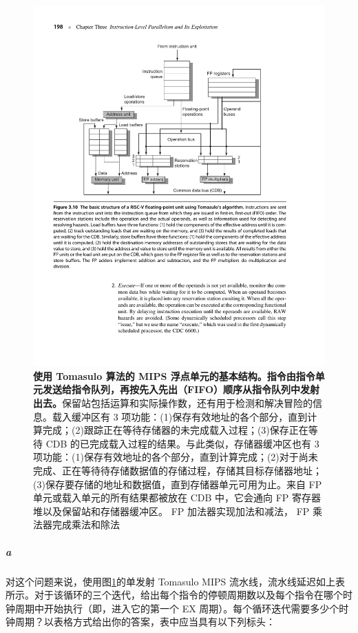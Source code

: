 \documentclass{article}
\begin{document}
\begin{figure}[h]
    \centering
    \includegraphics[scale = 1]{3-10.pdf}
    \caption{\textbf{使用 Tomasulo 算法的 MIPS 浮点单元的基本结构。指令由指令单元发送给指令队列，再按先入先出（FIFO）顺序从指令队列中发射出去。}保留站包括运算和实际操作数，还有用于检测和解决冒险的信息。载入缓冲区有 3 项功能：(1)保存有效地址的各个部分，直到计算完成；(2)跟踪正在等待存储器的未完成载入过程；(3)保存正在等待 CDB 的已完成载入过程的结果。与此类似，存储器缓冲区也有 3 项功能：(1)保存有效地址的各个部分，直到计算完成；(2)对于尚未完成、正在等待待存储数据值的存储过程，存储其目标存储器地址；(3)保存要存储的地址和数据值，直到存储器单元可用为止。来自 FP 单元或载入单元的所有结果都被放在 CDB 中，它会通向 FP 寄存器堆以及保留站和存储器缓冲区。 FP 加法器实现加法和减法， FP 乘法器完成乘法和除法}
    \label{3-4}
\end{figure}
\subparagraph{a} 对这个问题来说，使用图\ref{3-4}的单发射 Tomasulo MIPS 流水线，流水线延迟如上表所示。对于该循环的三个迭代，给出每个指令的停顿周期数以及每个指令在哪个时钟周期中开始执行（即，进入它的第一个 EX 周期）。每个循环迭代需要多少个时钟周期？以表格方式给出你的答案，表中应当具有以下列标头：
\end{document}
